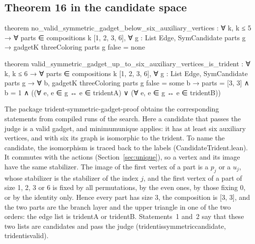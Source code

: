 \documentclass[11pt,a4paper]{article}
\newcommand{\leanus}{\textunderscore\allowbreak}
\newcommand{\lean}[1]{{\ttfamily\let\_\leanus #1}}
\begin{document}
\subsection{Theorem 16 in the candidate space}
\begin{code}
theorem no_valid_symmetric_gadget_below_six_auxiliary_vertices :
    ∀ k, k ≤ 5 → ∀ parts ∈ compositions k [1, 2, 3, 6], ∀ g : List Edge,
      SymCandidate parts g → gadgetK threeColoring parts g false = none

theorem valid_symmetric_gadget_up_to_six_auxiliary_vertices_is_trident :
    ∀ k, k ≤ 6 → ∀ parts ∈ compositions k [1, 2, 3, 6], ∀ g : List Edge,
      SymCandidate parts g →
      ∀ b, gadgetK threeColoring parts g false = some b →
        parts = [3, 3] ∧ b = 1 ∧
          ((∀ e, e ∈ g ↔ e ∈ tridentA) ∨ (∀ e, e ∈ g ↔ e ∈ tridentB))
\end{code}
The package \lean{trident-symmetric-gadget-proof} obtains the corresponding
statements from compiled runs of the search. Here a candidate that passes
the judge is a valid gadget, and
\lean{minimum\_unique} applies: it has at least six auxiliary vertices, and
with six its graph is isomorphic to the trident. To name the candidate, the
isomorphism is traced back to the labels (\lean{CandidateTrident.lean}). It
commutes with the actions (Section~\ref{sec:unique}), so a vertex and its
image have the same stabilizer. The image of the first vertex of a part is a
$p_j$ or a $u_j$, whose stabilizer is the stabilizer of the index $j$, and
the first vertex of a part of size 1, 2, 3 or 6 is fixed by all
permutations, by the even ones, by those fixing 0, or by the identity only.
Hence every part has size 3, the composition is \lean{[3, 3]}, and the two
parts are the branch layer and the upper triangle in one of the two orders:
the edge list is \lean{tridentA} or \lean{tridentB}. Statements~1 and~2 say
that these two lists are candidates and pass the judge
(\lean{trident\_is\_symmetric\_candidate}, \lean{trident\_is\_valid}).
\end{document}
